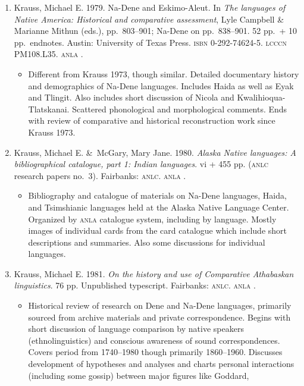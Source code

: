 \documentclass[12pt,letterpaper,oneside,article]{memoir}
\begin{document}
\begin{enumerate}
\item	Krauss, Michael E.
	1979.
	Na-Dene and Eskimo-Aleut.
	In \textit{The languages of Native America: Historical and comparative assessment},
	Lyle Campbell \& Marianne Mithun (eds.), pp.\ 803–901;
	Na-Dene on pp.\ 838–901.
	52 pp.\ + 10 pp.\ endnotes.
	Austin: University of Texas Press.
	\textsc{isbn} 0-292-74624-5.
	\textsc{lcccn} PM108.L35.
	\textsc{anla} .
	\begin{itemize}
	\item	Different from Krauss 1973, though similar.
		Detailed documentary history and demographics of Na-Dene languages.
		Includes Haida as well as Eyak and Tlingit.
		Also includes short discussion of Nicola and Kwalihioqua-Tlatskanai.
		Scattered phonological and morphological comments.
		Ends with review of comparative and historical reconstruction work
		since Krauss 1973.
	\end{itemize}
\item	Krauss, Michael E. \&\ McGary, Mary Jane.
	1980.
	\textit{Alaska Native languages: A bibliographical catalogue, part 1: Indian languages}.
	vi + 455 pp.
	(\textsc{anlc} research papers no.\ 3).
	Fairbanks: \textsc{anlc}.
	\textsc{anla} .
	\begin{itemize}
	\item	Bibliography and catalogue of materials on Na-Dene languages, Haida, and
		Tsimshianic languages held at the Alaska Native Language Center.
		Organized by \textsc{anla} catalogue system, including by language.
		Mostly images of individual cards from the card catalogue which include
		short descriptions and summaries.
		Also some discussions for individual languages.
	\end{itemize}
\item	Krauss, Michael E.
	1981.
	\textit{On the history and use of Comparative Athabaskan linguistics}.
	76 pp.
	Unpublished typescript.
	Fairbanks: \textsc{anlc}.
	\textsc{anla} .
	\begin{itemize}
	\item	Historical review of research on Dene and Na-Dene languages, primarily
		sourced from archive materials and private correspondence.
		Begins with short discussion of language comparison by native speakers
		(ethnolinguistics) and conscious awareness of sound correspondences.
		Covers period from 1740–1980 though primarily 1860–1960.
		Discusses development of hypotheses and analyses and charts personal
		interactions (including some gossip) between major figures like Goddard,

\end{itemize}
\end{enumerate}
\end{document}
